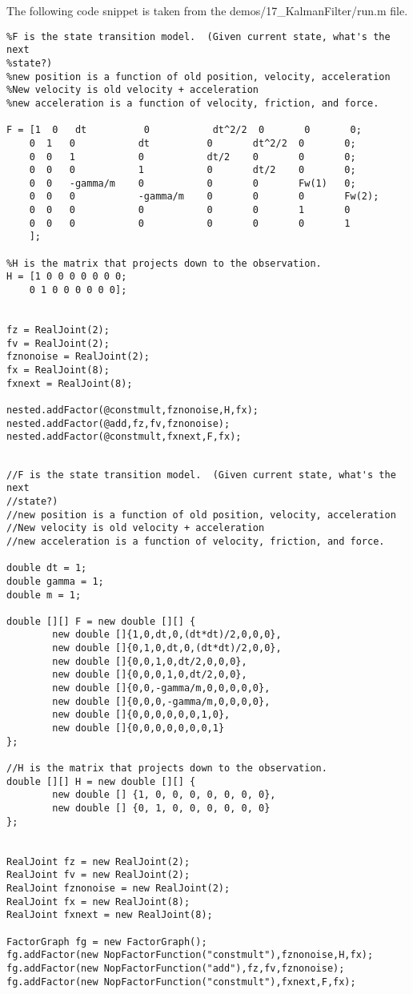 \ifmatlab
The following code snippet is taken from the demos/17\_KalmanFilter/run.m file.


\begin{lstlisting}
%F is the state transition model.  (Given current state, what's the next 
%state?)
%new position is a function of old position, velocity, acceleration
%New velocity is old velocity + acceleration
%new acceleration is a function of velocity, friction, and force. 
 
F = [1  0   dt          0           dt^2/2  0       0       0;
    0  1   0           dt          0       dt^2/2  0       0;
    0  0   1           0           dt/2    0       0       0;
    0  0   0           1           0       dt/2    0       0;
    0  0   -gamma/m    0           0       0       Fw(1)   0;
    0  0   0           -gamma/m    0       0       0       Fw(2);
    0  0   0           0           0       0       1       0
    0  0   0           0           0       0       0       1
    ];
 
%H is the matrix that projects down to the observation.
H = [1 0 0 0 0 0 0 0;
    0 1 0 0 0 0 0 0];


fz = RealJoint(2);
fv = RealJoint(2);
fznonoise = RealJoint(2);
fx = RealJoint(8);
fxnext = RealJoint(8);

nested.addFactor(@constmult,fznonoise,H,fx);
nested.addFactor(@add,fz,fv,fznonoise);
nested.addFactor(@constmult,fxnext,F,fx);
\end{lstlisting}
\fi

\ifjava

\begin{lstlisting}

//F is the state transition model.  (Given current state, what's the next 
//state?)
//new position is a function of old position, velocity, acceleration
//New velocity is old velocity + acceleration
//new acceleration is a function of velocity, friction, and force. 

double dt = 1;
double gamma = 1;
double m = 1;

double [][] F = new double [][] {
		new double []{1,0,dt,0,(dt*dt)/2,0,0,0},
		new double []{0,1,0,dt,0,(dt*dt)/2,0,0},
		new double []{0,0,1,0,dt/2,0,0,0},
		new double []{0,0,0,1,0,dt/2,0,0},
		new double []{0,0,-gamma/m,0,0,0,0,0},
		new double []{0,0,0,-gamma/m,0,0,0,0},
		new double []{0,0,0,0,0,0,1,0},
		new double []{0,0,0,0,0,0,0,1}
};

//H is the matrix that projects down to the observation.
double [][] H = new double [][] {
		new double [] {1, 0, 0, 0, 0, 0, 0, 0},
		new double [] {0, 1, 0, 0, 0, 0, 0, 0}
};


RealJoint fz = new RealJoint(2);
RealJoint fv = new RealJoint(2);
RealJoint fznonoise = new RealJoint(2);
RealJoint fx = new RealJoint(8);
RealJoint fxnext = new RealJoint(8);

FactorGraph fg = new FactorGraph();
fg.addFactor(new NopFactorFunction("constmult"),fznonoise,H,fx);
fg.addFactor(new NopFactorFunction("add"),fz,fv,fznonoise);
fg.addFactor(new NopFactorFunction("constmult"),fxnext,F,fx);
\end{lstlisting}


